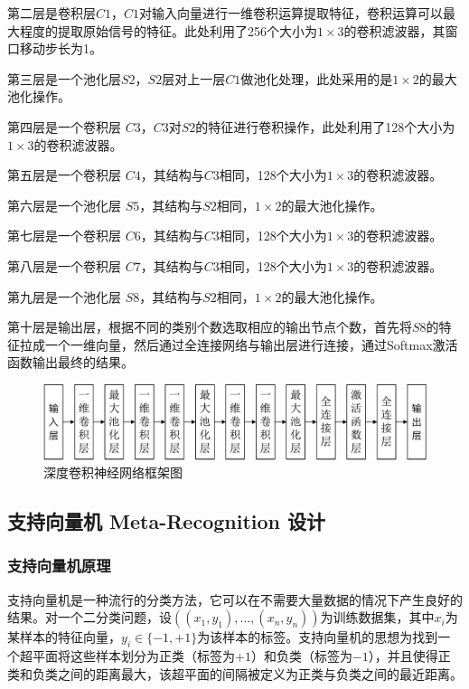 第二层是卷积层$C1$，$C1$对输入向量进行一维卷积运算提取特征，卷积运算可以最
大程度的提取原始信号的特征。此处利用了256个大小为$1\times 3$的卷积滤波器，其窗口移动步长为1。

第三层是一个池化层$S2$，$S2$层对上一层$C1$做池化处理，此处采用的是$1\times 2$的最大池化操作。

第四层是一个卷积层 $C3$，$C3$对$S2$的特征进行卷积操作，此处利用了128个大小为$1\times 3$的卷积滤波器。

第五层是一个卷积层 $C4$，其结构与$C3$相同，128个大小为$1\times 3$的卷积滤波器。

第六层是一个池化层 $S5$，其结构与$S2$相同，$1\times 2$的最大池化操作。

第七层是一个卷积层 $C6$，其结构与$C3$相同，128个大小为$1\times 3$的卷积滤波器。

第八层是一个卷积层 $C7$，其结构与$C3$相同，128个大小为$1\times 3$的卷积滤波器。

第九层是一个池化层 $S8$，其结构与$S2$相同，$1\times 2$的最大池化操作。

第十层是输出层，根据不同的类别个数选取相应的输出节点个数，首先将$S8$的特征拉成一个一维向量，然后通过全连接网络与输出层进行连接，通过Softmax激活函数输出最终的结果。

\begin{figure}[hbt]
	\centering
	\includegraphics[width=13.5cm]{figures/emitter/struct_emitter}
	\caption{深度卷积神经网络框架图}
	\label{fig:struct_emitter}
\end{figure}

\subsection{支持向量机 Meta-Recognition 设计}

\subsubsection{支持向量机原理}
支持向量机是一种流行的分类方法，它可以在不需要大量数据的情况下产生良好的结果。对一个二分类问题，设$((x_1,y_1),\dots,(x_n,y_n))$为训练数据集，其中$x_i$为某样本的特征向量，$y_i\in\{-1,+1\}$为该样本的标签。支持向量机的思想为找到一个超平面将这些样本划分为正类（标签为$+1$）和负类（标签为$-1$），并且使得正类和负类之间的距离最大，该超平面的间隔被定义为正类与负类之间的最近距离。

